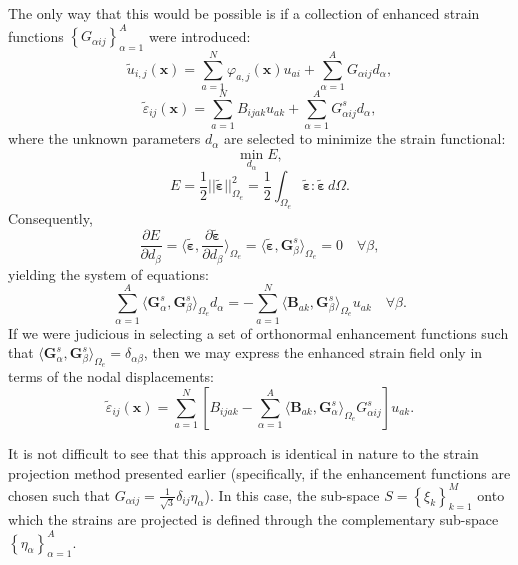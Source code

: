The only way that this would be possible is if a collection of enhanced strain functions $\left\{ G_{\alpha ij} \right\}_{\alpha = 1}^A$ were introduced:
\begin{equation}
  \tilde{u}_{i,j} (\mathbf{x}) = \sum_{a = 1}^N \varphi_{a,j} (\mathbf{x}) u_{ai} + \sum_{\alpha=1}^A G_{\alpha ij} d_{\alpha},
\end{equation}
\begin{equation}
  \tilde{\varepsilon}_{ij} (\mathbf{x}) = \sum_{a = 1}^N B_{ijak} u_{ak} + \sum_{\alpha=1}^A G^s_{\alpha ij} d_{\alpha},
\end{equation}
where the unknown parameters $d_{\alpha}$ are selected to minimize the strain functional:
\begin{equation}
  \min_{d_{\alpha}} E,
\end{equation}
\begin{equation}
  E = \frac{1}{2} || \tilde{\boldsymbol{\varepsilon}} ||^2_{\Omega_e} = \frac{1}{2} \int_{\Omega_e} \tilde{\boldsymbol{\varepsilon}} \colon \tilde{\boldsymbol{\varepsilon}} \, d \Omega.
\end{equation}
Consequently,
\begin{equation}
  \frac{\partial E}{\partial d_{\beta}} = \langle \tilde{\boldsymbol{\varepsilon}}, \frac{\partial \tilde{\boldsymbol{\varepsilon}}}{\partial d_{\beta}} \rangle_{\Omega_e} = \langle \tilde{\boldsymbol{\varepsilon}}, \mathbf{G}^s_{\beta} \rangle_{\Omega_e} = 0 \quad \forall \beta,
\end{equation}
yielding the system of equations:
\begin{equation}
  \sum_{\alpha=1}^A \langle \mathbf{G}^s_{\alpha}, \mathbf{G}^s_{\beta} \rangle_{\Omega_e} d_{\alpha} = - \sum_{a = 1}^N \langle \mathbf{B}_{ak}, \mathbf{G}^s_{\beta} \rangle_{\Omega_e} u_{ak} \quad \forall \beta.
\end{equation}
If we were judicious in selecting a set of orthonormal enhancement functions such that $\langle \mathbf{G}^s_{\alpha}, \mathbf{G}^s_{\beta} \rangle_{\Omega_e} = \delta_{\alpha \beta}$, then we may express the enhanced strain field only in terms of the nodal displacements:
\begin{equation}
  \tilde{\varepsilon}_{ij} (\mathbf{x}) = \sum_{a = 1}^N \left[ B_{ijak} - \sum_{\alpha=1}^A \langle \mathbf{B}_{ak}, \mathbf{G}^s_{\alpha} \rangle_{\Omega_e} G^s_{\alpha ij} \right] u_{ak}.
\end{equation}

It is not difficult to see that this approach is identical in nature to the strain projection method presented earlier (specifically, if the enhancement functions are chosen such that $G_{\alpha ij} = \frac{1}{\sqrt{3}} \delta_{ij} \eta_{\alpha}$). In this case, the sub-space $S = \left\{ \xi_k \right\}_{k=1}^M$ onto which the strains are projected is defined through the complementary sub-space $\left\{ \eta_{\alpha} \right\}_{\alpha = 1}^A$.

